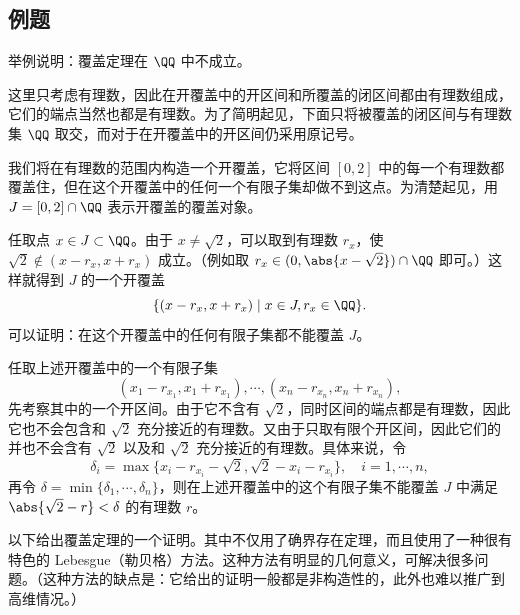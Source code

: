 \subsection{例题}

\begin{xexample}[3.5.1]
举例说明：覆盖定理在 $\QQ$ 中不成立。
\end{xexample}
\begin{xremark}
这里只考虑有理数，因此在开覆盖中的开区间和所覆盖的闭区间都由有理数组成，它们的端点当然也都是有理数。为了简明起见，下面只将被覆盖的闭区间与有理数集 $\QQ$ 取交，而对于在开覆盖中的开区间仍采用原记号。
\end{xremark}
\begin{xsolution}
我们将在有理数的范围内构造一个开覆盖，它将区间 $[0,2]$ 中的每一个有理数都覆盖住，但在这个开覆盖中的任何一个有限子集却做不到这点。为清楚起见，用 $J=[0,2]\cap\QQ$ 表示开覆盖的覆盖对象。

任取点 $x\in J\subset\QQ$。由于 $x\neq\sqrt2$，可以取到有理数 $r_x$，使 $\sqrt2\notin(x-r_x,x+r_x)$ 成立。（例如取 $r_x\in(0,\abs{x-\sqrt2})\cap\QQ$ 即可。）这样就得到 $J$ 的一个开覆盖
\[
  \{(x-r_x,x+r_x)\mid x\in J,r_x\in\QQ\}.
\]
可以证明：在这个开覆盖中的任何有限子集都不能覆盖 $J$。

任取上述开覆盖中的一个有限子集
\[
  (x_1-r_{x_1},x_1+r_{x_1}),\cdots,(x_n-r_{x_n},x_n+r_{x_n}),
\]
先考察其中的一个开区间。由于它不含有 $\sqrt2$，同时区间的端点都是有理数，因此它也不会包含和 $\sqrt2$ 充分接近的有理数。又由于只取有限个开区间，因此它们的并也不会含有 $\sqrt2$ 以及和 $\sqrt2$ 充分接近的有理数。具体来说，令
\[
  \delta_i=\max\{x_i-r_{x_i}-\sqrt2,\sqrt2-x_i-r_{x_i}\},\quad i=1,\cdots,n,
\]
再令 $\delta=\min\{\delta_1,\cdots,\delta_n\}$，则在上述开覆盖中的这个有限子集不能覆盖 $J$ 中满足 $\abs{\sqrt2-r}<\delta$ 的有理数 $r$。
\end{xsolution}

以下给出覆盖定理的一个证明。其中不仅用了确界存在定理，而且使用了一种很有特色的 Lebesgue（勒贝格）方法。这种方法有明显的几何意义，可解决很多问题。（这种方法的缺点是：它给出的证明一般都是非构造性的，此外也难以推广到高维情况。）

